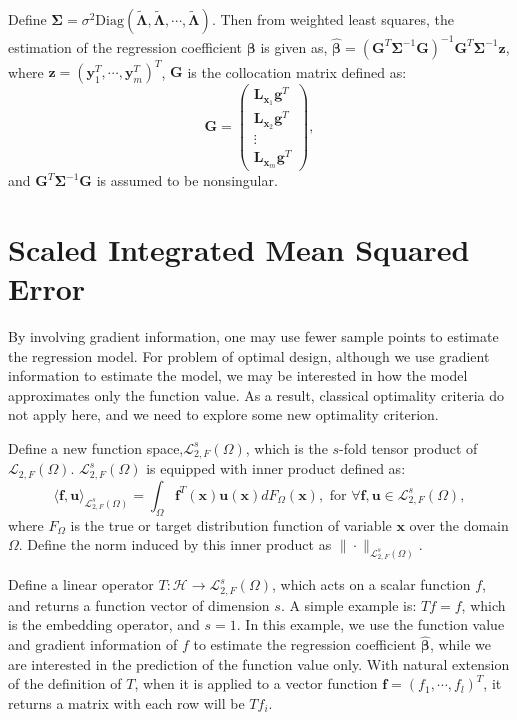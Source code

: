 \documentclass[preprint,12pt]{elsarticle}
\begin{document}
Define $\boldsymbol{\Sigma}=\sigma^2\text{Diag}\left(
\widetilde{\boldsymbol{\Lambda}}, \widetilde{\boldsymbol{\Lambda}},
\cdots, \widetilde{\boldsymbol{\Lambda}}\right)$. Then from weighted
least squares, the estimation of the regression coefficient
$\boldsymbol{\beta}$ is given as,
$\hat{\boldsymbol{\beta}}=(\mathbf{G}^T\boldsymbol{\Sigma}^{-1}\mathbf{G})^{-1}\mathbf{G}^T\boldsymbol{\Sigma}^{-1}\boldsymbol{z}$,
where $\boldsymbol{z}=(\boldsymbol{y}_1^T,\cdots,
\boldsymbol{y}_m^T)^T$, $\mathbf{G}$ is the collocation matrix
defined as:
$$\boldsymbol{G}=\left( \begin{array}{c}
\mathbf{L}_{\boldsymbol{x}_1}\boldsymbol{g}^T\\
\mathbf{L}_{\boldsymbol{x}_2}\boldsymbol{g}^T\\
\vdots\\
\mathbf{L}_{\boldsymbol{x}_m}\boldsymbol{g}^T
\end{array}\right)
,$$ and $\mathbf{G}^T\boldsymbol{\Sigma}^{-1}\mathbf{G}$ is assumed
to be nonsingular.

\section{Scaled Integrated Mean Squared Error}
\label{section:Iopt}

By involving gradient information, one may use fewer sample points
to estimate the regression model. For problem of optimal design,
although we use gradient information to estimate the model, we may
be interested in how the model approximates only the function value.
As a result, classical optimality criteria do not apply here, and we
need to explore some new optimality criterion.

Define a new function space,$\mathcal {L}_{2,F}^s(\Omega)$, which is
the $s$-fold tensor product of $\mathcal{L}_{2,F}(\Omega)$.
$\mathcal {L}_{2,F}^s(\Omega)$ is equipped with inner product
defined as:
$$\langle\boldsymbol{f}, \boldsymbol{u}\rangle_{\mathcal {L}_{2,F}^s(\Omega)}=\int_{\Omega}\boldsymbol{f}^T(\boldsymbol{x})\boldsymbol{u}(\boldsymbol{x})dF_{\Omega}(\boldsymbol{x}),
\text{  for  }\forall \boldsymbol{f},\boldsymbol{u}\in \mathcal
{L}_{2,F}^s(\Omega),$$ where $F_{\Omega}$ is the true or target
distribution function of variable $\boldsymbol{x}$ over the domain
$\Omega$. Define the norm induced by this inner product as
$\|\cdot\|_{\mathcal {L}_{2,F}^s(\Omega)}$.


Define a linear operator $T:\mathcal {H}\rightarrow \mathcal
{L}_{2,F}^s(\Omega)$, which acts on a scalar function $f$, and
returns a function vector of dimension $s$. A simple example is:
$Tf=f$, which is the embedding operator, and $s=1$. In this example,
we use the function value and gradient information of $f$ to
estimate the regression coefficient $\hat{\boldsymbol{\beta}}$,
while we are interested in the prediction of the function value
only. With natural extension of the definition of $T$, when it is
applied to a vector function $\boldsymbol{f}=(f_1,\cdots,f_l)^T$, it
returns a matrix with each row will be $Tf_i$.
\end{document}
